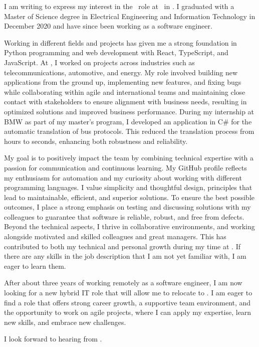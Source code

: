 I am writing to express my interest in the \ROLE\ role at \COMPANY\ in \CITY. I graduated with a Master of Science degree in Electrical Engineering and Information Technology in December 2020 and have since been working as a software engineer.

Working in different fields and projects has given me a strong foundation in Python programming and web development with React, TypeScript, and JavaScript. At \companyNow, I worked on projects across industries such as telecommunications, automotive, and energy. My role involved building new applications from the ground up, implementing new features, and fixing bugs while collaborating within agile and international teams and maintaining close contact with stakeholders to ensure alignment with business needs, resulting in optimized solutions and improved business performance. During my internship at BMW as part of my master's program, I developed an application in C\# for the automatic translation of bus protocols. This reduced the translation process from hours to seconds, enhancing both robustness and reliability.

My goal is to positively impact the team by combining technical expertise with a passion for communication and continuous learning. My GitHub profile reflects my enthusiasm for automation and my curiosity about working with different programming languages. I value simplicity and thoughtful design, principles that lead to maintainable, efficient, and superior solutions. To ensure the best possible outcomes, I place a strong emphasis on testing and discussing solutions with my colleagues to guarantee that software is reliable, robust, and free from defects. Beyond the technical aspects, I thrive in collaborative environments, and working alongside motivated and skilled colleagues and great managers. This has contributed to both my technical and personal growth during my time at \companyNow. If there are any skills in the job description that I am not yet familiar with, I am eager to learn them.

After about three years of working remotely as a software engineer, I am now looking for a new hybrid IT role that will allow me to relocate to \CITY. I am eager to find a role that offers strong career growth, a supportive team environment, and the opportunity to work on agile projects, where I can apply my expertise, learn new skills, and embrace new challenges.

I look forward to hearing from \COMPANY.